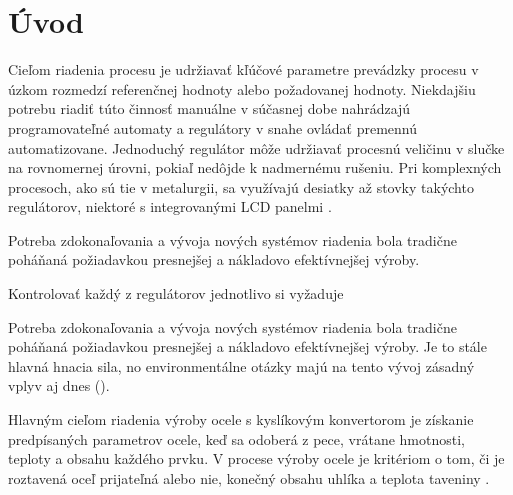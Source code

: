 \documentclass[]{tukediphc}
\begin{document}
\renewcommand\theHfigure{\theHsection.\arabic{figure}}
\renewcommand\theHtable{\theHsection.\arabic{table}}


\prvastrana


\thispagestyle{empty}
\tableofcontents
\newpage
%
%


\setcounter{page}{1}
\setcounter{equation}{0}
\setcounter{figure}{0}
\setcounter{table}{0}

\section{Úvod}

Cieľom riadenia procesu je udržiavať kľúčové parametre prevádzky procesu v úzkom rozmedzí referenčnej hodnoty alebo požadovanej hodnoty. Niekdajšiu potrebu riadiť túto činnosť manuálne v súčasnej dobe nahrádzajú programovateľné automaty a regulátory v snahe ovládať premennú automatizovane. Jednoduchý regulátor môže udržiavať procesnú veličinu v slučke na rovnomernej úrovni, pokiaľ nedôjde k nadmernému rušeniu. Pri komplexných procesoch, ako sú tie v metalurgii, sa využívajú desiatky až stovky takýchto regulátorov, niektoré s integrovanými LCD panelmi \citep{Al-Megren2016}.

Potreba zdokonaľovania a vývoja nových systémov riadenia bola tradične poháňaná požiadavkou presnejšej a nákladovo efektívnejšej výroby. 

Kontrolovať každý z regulátorov jednotlivo si vyžaduje 


Potreba zdokonaľovania a vývoja nových systémov riadenia bola tradične poháňaná požiadavkou presnejšej a nákladovo efektívnejšej výroby. Je to stále hlavná hnacia sila, no environmentálne otázky majú na tento vývoj zásadný vplyv aj dnes (\cite{Widlund1998}).

Hlavným cieľom riadenia výroby ocele s kyslíkovým konvertorom je získanie predpísaných parametrov ocele, keď sa odoberá z pece, vrátane hmotnosti, teploty a obsahu každého prvku. V procese výroby ocele je kritériom o tom, či je roztavená oceľ prijateľná alebo nie, konečný obsahu uhlíka a teplota taveniny \cite{Wang2010}.
\end{document}
